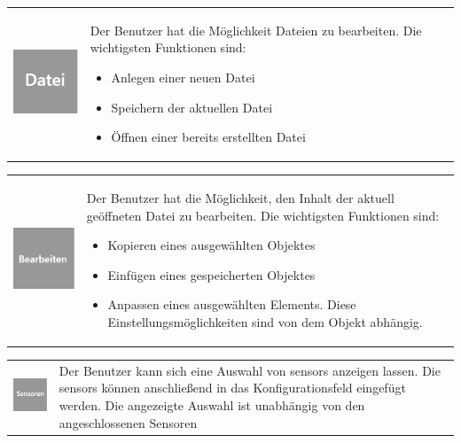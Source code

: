 \documentclass[parskip=full]{scrartcl}
\begin{document}
\begin{tabular}[t]{p{1cm} p{10cm}} %
	\vspace{0cm}\includegraphics[width = 1 cm]{Grafik/Datei.png} & Der Benutzer hat die Möglichkeit Dateien zu bearbeiten. Die wichtigsten Funktionen sind:
	\begin{itemize} 
		\item Anlegen einer neuen Datei
		\item Speichern der aktuellen Datei
		\item Öffnen einer bereits erstellten Datei
	\end{itemize}\\
\end{tabular}

\begin{tabular}[t]{p{1cm} p{10cm}} %
	\vspace{0cm}\includegraphics[width = 1 cm]{Grafik/Bearbeiten.png} & Der Benutzer hat die Möglichkeit, den Inhalt der aktuell geöffneten Datei zu bearbeiten. Die wichtigsten Funktionen sind:
	\begin{itemize} 
		\item Kopieren eines ausgewählten Objektes
		\item Einfügen eines gespeicherten Objektes
		\item Anpassen eines ausgewählten Elements. Diese Einstellungsmöglichkeiten sind von dem Objekt abhängig.
	\end{itemize}
\end{tabular}

\begin{tabular}[t]{p{1cm} p{10cm}} %
	\vspace{0cm}\includegraphics[width = 1 cm]{Grafik/Sensor.png} & Der Benutzer kann sich eine Auswahl von \glspl{sensor} anzeigen lassen. Die \glspl{sensor} können anschließend in das Konfigurationsfeld eingefügt werden. Die angezeigte Auswahl ist unabhängig von den angeschlossenen Sensoren\newline
\end{tabular}
\end{document}
